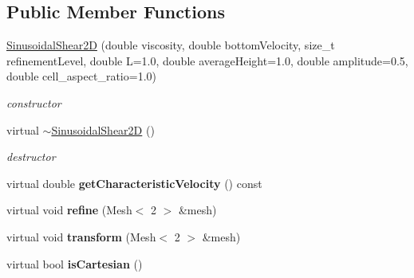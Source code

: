 \subsection*{Public Member Functions}
\begin{DoxyCompactItemize}
\item 
\hypertarget{classnatrium_1_1SinusoidalShear2D_a795ec020c20dac79280c1eec89bb8b11}{
\hyperlink{classnatrium_1_1SinusoidalShear2D_a795ec020c20dac79280c1eec89bb8b11}{SinusoidalShear2D} (double viscosity, double bottomVelocity, size\_\-t refinementLevel, double L=1.0, double averageHeight=1.0, double amplitude=0.5, double cell\_\-aspect\_\-ratio=1.0)}
\label{classnatrium_1_1SinusoidalShear2D_a795ec020c20dac79280c1eec89bb8b11}

\begin{DoxyCompactList}\small\item\em constructor \item\end{DoxyCompactList}\item 
\hypertarget{classnatrium_1_1SinusoidalShear2D_a7aaf185e32e29f1f50b3f9db9c213a2c}{
virtual \hyperlink{classnatrium_1_1SinusoidalShear2D_a7aaf185e32e29f1f50b3f9db9c213a2c}{$\sim$SinusoidalShear2D} ()}
\label{classnatrium_1_1SinusoidalShear2D_a7aaf185e32e29f1f50b3f9db9c213a2c}

\begin{DoxyCompactList}\small\item\em destructor \item\end{DoxyCompactList}\item 
\hypertarget{classnatrium_1_1SinusoidalShear2D_af1162ca66457ddfa460f379f1544a5f5}{
virtual double {\bfseries getCharacteristicVelocity} () const }
\label{classnatrium_1_1SinusoidalShear2D_af1162ca66457ddfa460f379f1544a5f5}

\item 
\hypertarget{classnatrium_1_1SinusoidalShear2D_a71fb2e08f98dceb652a10d4a8da8de0e}{
virtual void {\bfseries refine} (Mesh$<$ 2 $>$ \&mesh)}
\label{classnatrium_1_1SinusoidalShear2D_a71fb2e08f98dceb652a10d4a8da8de0e}

\item 
\hypertarget{classnatrium_1_1SinusoidalShear2D_a759174d865cdff661b709554c625e8cf}{
virtual void {\bfseries transform} (Mesh$<$ 2 $>$ \&mesh)}
\label{classnatrium_1_1SinusoidalShear2D_a759174d865cdff661b709554c625e8cf}

\item 
\hypertarget{classnatrium_1_1SinusoidalShear2D_aa18d6a49d7d96bb7896be74894bfe2e1}{
virtual bool {\bfseries isCartesian} ()}
\label{classnatrium_1_1SinusoidalShear2D_aa18d6a49d7d96bb7896be74894bfe2e1}

\end{DoxyCompactItemize}


